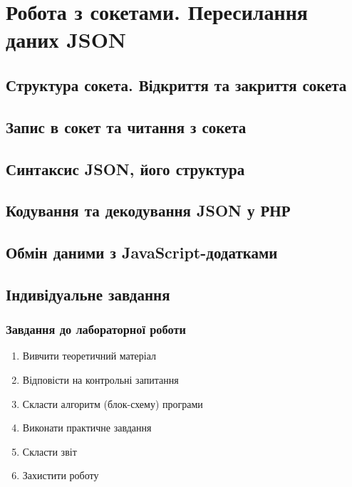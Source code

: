 \chapter{Робота з сокетами. Пересилання даних JSON}
\section{Структура сокета. Відкриття та закриття сокета}

\section{Запис в сокет та читання з сокета}
\section{Синтаксис JSON, його структура}

\section{Кодування та декодування JSON у РНР}
\section{Обмін даними з JavaScript-додатками}


\pagebreak[3]
\section{Індивідуальне завдання}

\nopagebreak[4]
\subsection*{Завдання до лабораторної роботи}
\nopagebreak[4]
\begin{enumerate}
\item Вивчити теоретичний матеріал
\item Відповісти на контрольні запитання
\item Скласти алгоритм (блок-схему) програми
\item Виконати практичне завдання
\item Скласти звіт
\item Захистити роботу
\end{enumerate}


